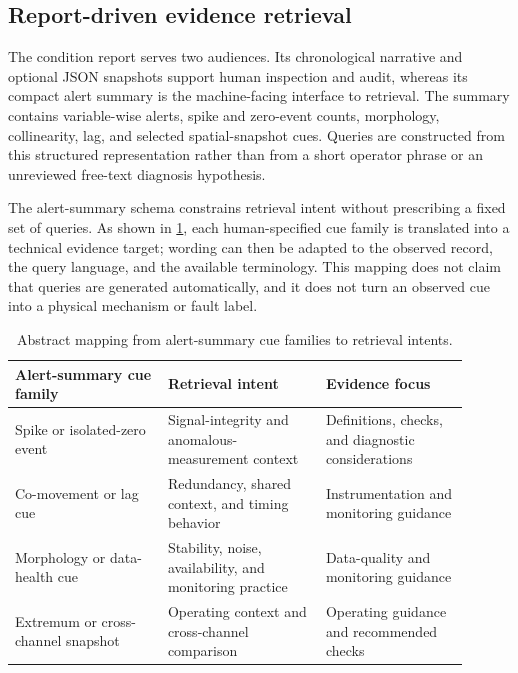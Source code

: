 \subsection{Report-driven evidence retrieval}
\label{sec:rag-diag}

The condition report serves two audiences. Its chronological narrative and optional JSON snapshots support human inspection and audit, whereas its compact alert summary is the machine-facing interface to retrieval. The summary contains variable-wise alerts, spike and zero-event counts, morphology, collinearity, lag, and selected spatial-snapshot cues. Queries are constructed from this structured representation rather than from a short operator phrase or an unreviewed free-text diagnosis hypothesis.

The alert-summary schema constrains retrieval intent without prescribing a fixed set of queries. As shown in \cref{tab:alert-query-intents}, each human-specified cue family is translated into a technical evidence target; wording can then be adapted to the observed record, the query language, and the available terminology. This mapping does not claim that queries are generated automatically, and it does not turn an observed cue into a physical mechanism or fault label.

\begin{table}[H]
  \centering
  \footnotesize
  \setlength{\tabcolsep}{3pt}
  \caption{Abstract mapping from alert-summary cue families to retrieval intents.}
  \label{tab:alert-query-intents}
  \begin{tabular}{@{}>{\raggedright\arraybackslash}p{0.30\linewidth}
                    >{\raggedright\arraybackslash}p{0.31\linewidth}
                    >{\raggedright\arraybackslash}p{0.29\linewidth}@{}}
    \toprule
    Alert-summary cue family & Retrieval intent & Evidence focus \\
    \midrule
    Spike or isolated-zero event & Signal-integrity and anomalous-measurement context & Definitions, checks, and diagnostic considerations \\
    Co-movement or lag cue & Redundancy, shared context, and timing behavior & Instrumentation and monitoring guidance \\
    Morphology or data-health cue & Stability, noise, availability, and monitoring practice & Data-quality and monitoring guidance \\
    Extremum or cross-channel snapshot & Operating context and cross-channel comparison & Operating guidance and recommended checks \\
    \bottomrule
  \end{tabular}
\end{table}

